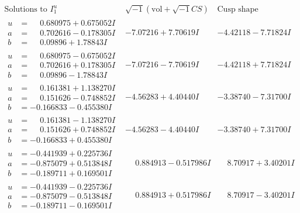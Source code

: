\documentclass[1p]{elsarticle_modified}
\theoremstyle{definition}
\newcommand{\I}{\sqrt{-1}}
\begin{document}
$$\begin{array}{c|c|c}  
\text{Solutions to }I^u_{1}& \I (\text{vol} + \sqrt{-1}CS) & \text{Cusp shape}\\
 \hline 
\begin{aligned}
u &= \phantom{-}0.680975 + 0.675052 I \\
a &= \phantom{-}0.702616 - 0.178305 I \\
b &= \phantom{-}0.09896 + 1.78843 I\end{aligned}
 & -7.07216 + 7.70619 I & -4.42118 - 7.71824 I \\ \hline\begin{aligned}
u &= \phantom{-}0.680975 - 0.675052 I \\
a &= \phantom{-}0.702616 + 0.178305 I \\
b &= \phantom{-}0.09896 - 1.78843 I\end{aligned}
 & -7.07216 - 7.70619 I & -4.42118 + 7.71824 I \\ \hline\begin{aligned}
u &= \phantom{-}0.161381 + 1.138270 I \\
a &= \phantom{-}0.151626 - 0.748852 I \\
b &= -0.166833 - 0.455380 I\end{aligned}
 & -4.56283 + 4.40440 I & -3.38740 - 7.31700 I \\ \hline\begin{aligned}
u &= \phantom{-}0.161381 - 1.138270 I \\
a &= \phantom{-}0.151626 + 0.748852 I \\
b &= -0.166833 + 0.455380 I\end{aligned}
 & -4.56283 - 4.40440 I & -3.38740 + 7.31700 I \\ \hline\begin{aligned}
u &= -0.441939 + 0.225736 I \\
a &= -0.875079 + 0.513848 I \\
b &= -0.189711 + 0.169501 I\end{aligned}
 & \phantom{-}0.884913 - 0.517986 I & \phantom{-}8.70917 + 3.40201 I \\ \hline\begin{aligned}
u &= -0.441939 - 0.225736 I \\
a &= -0.875079 - 0.513848 I \\
b &= -0.189711 - 0.169501 I\end{aligned}
 & \phantom{-}0.884913 + 0.517986 I & \phantom{-}8.70917 - 3.40201 I \\ \hline\begin{aligned}

\end{aligned}
\end{array}$$
\end{document}
